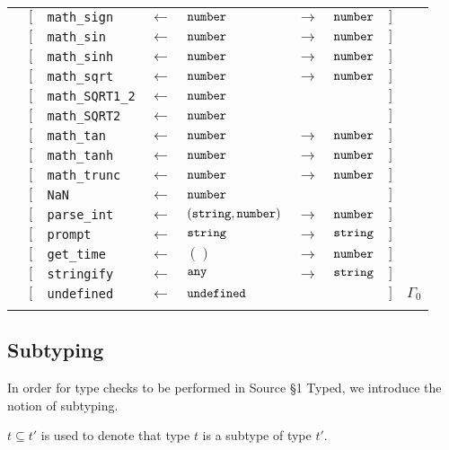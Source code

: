 \begin{tabular}[fragile]{lllllllll}
& $[$ & \texttt{math\_sign} & $\leftarrow$  & $\texttt{number}$ & $\rightarrow$ & $\texttt{number}$ & $]$ \\
& $[$ & \texttt{math\_sin} & $\leftarrow$  & $\texttt{number}$ & $\rightarrow$ & $\texttt{number}$ & $]$ \\
& $[$ & \texttt{math\_sinh} & $\leftarrow$  & $\texttt{number}$ & $\rightarrow$ & $\texttt{number}$ & $]$ \\
& $[$ & \texttt{math\_sqrt} & $\leftarrow$  & $\texttt{number}$ & $\rightarrow$ & $\texttt{number}$ & $]$ \\
& $[$ & \texttt{math\_SQRT1\_2} & $\leftarrow$  & $\texttt{number}$ & & & $]$ \\
& $[$ & \texttt{math\_SQRT2} & $\leftarrow$  & $\texttt{number}$ & & & $]$ \\
& $[$ & \texttt{math\_tan} & $\leftarrow$  & $\texttt{number}$ & $\rightarrow$ & $\texttt{number}$ & $]$ \\
& $[$ & \texttt{math\_tanh} & $\leftarrow$  & $\texttt{number}$ & $\rightarrow$ & $\texttt{number}$ & $]$ \\
& $[$ & \texttt{math\_trunc} & $\leftarrow$  & $\texttt{number}$ & $\rightarrow$ & $\texttt{number}$ & $]$ \\
& $[$ & \texttt{NaN} & $\leftarrow$  & $\texttt{number}$ & & & $]$ \\
& $[$ & \texttt{parse\_int} & $\leftarrow$  & $(\texttt{string}, \texttt{number})$ & $\rightarrow$ & $\texttt{number}$ & $]$ \\
& $[$ & \texttt{prompt} & $\leftarrow$  & $\texttt{string}$ & $\rightarrow$ & $\texttt{string}$ & $]$ \\
& $[$ & \texttt{get\_time} & $\leftarrow$  & $()$ & $\rightarrow$ & $\texttt{number}$ & $]$ \\
& $[$ & \texttt{stringify} & $\leftarrow$  & $\texttt{any}$ & $\rightarrow$ & $\texttt{string}$ & $]$ \\
& $[$ & \texttt{undefined} & $\leftarrow$  & $\texttt{undefined}$ & & & $]$ & $\Gamma_0$ \\
& \end{tabular}

\subsection{Subtyping}

In order for type checks to be performed in Source \S 1 Typed, we introduce the notion of subtyping.

\begin{definition}
$t \subseteq t'$ is used to denote that type $t$ is a subtype of type $t'$.
\end{definition}

